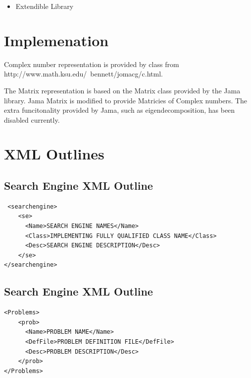 \documentclass[authoryearcitations]{UoYCSproject}
\begin{document}
\begin{itemize}
 \item Extendible Library
\end{itemize}

\chapter{Implemenation}

Complex number representation is provided by class from http://www.math.ksu.edu/~bennett/jomacg/c.html.

The Matrix representation is based on the Matrix class provided by the Jama library.
Jama Matrix is modified to provide Matricies of Complex numbers.
The extra funcitonality provided by Jama, such as eigendecomposition, has been disabled currently.


\appendix

\chapter{XML Outlines}
\section{Search Engine XML Outline}
\label{sec:semanspecxml}
\lstset{language = XML}
\begin{lstlisting}
 <searchengine>
	<se>
	  <Name>SEARCH ENGINE NAMES</Name>
	  <Class>IMPLEMENTING FULLY QUALIFIED CLASS NAME</Class>
	  <Desc>SEARCH ENGINE DESCRIPTION</Desc>
	</se>
</searchengine>
\end{lstlisting}

\section{Search Engine XML Outline}
\label{sec:probmanspecxml}
\lstset{language = XML}
\begin{lstlisting}
<Problems>
	<prob>
	  <Name>PROBLEM NAME</Name>
	  <DefFile>PROBLEM DEFINITION FILE</DefFile>
	  <Desc>PROBLEM DESCRIPTION</Desc>
	</prob>
</Problems>
\end{lstlisting}
\end{document}
